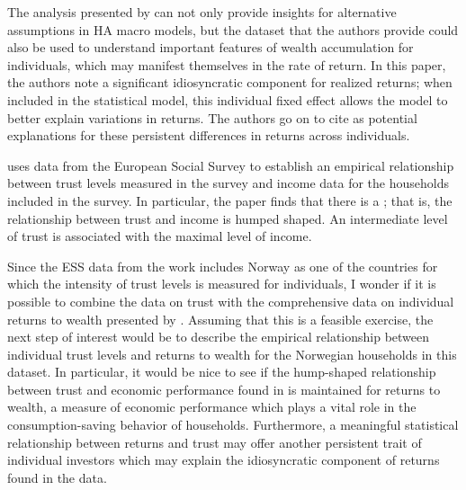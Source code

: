 \documentclass{scrartcl}
\begin{document}
The analysis presented by \cite{aflgdmlp20} can not only provide insights for alternative assumptions in HA macro models, but the dataset that the authors provide could also be used to understand important features of wealth accumulation for individuals, which may manifest themselves in the rate of return. In this paper, the authors note a significant idiosyncratic component for realized returns; when included in the statistical model, this individual fixed effect allows the model to better explain variations in returns. The authors go on to cite  as potential explanations for these persistent differences in returns across individuals.

\cite{jbpglg2016} uses data from the European Social Survey to establish an empirical relationship between trust levels measured in the survey and income data for the households included in the survey. In particular, the paper finds that there is a ; that is, the relationship between trust and income is humped shaped. An intermediate level of trust is associated with the maximal level of income. 

Since the ESS data from the \cite{jbpglg2016} work includes Norway as one of the countries for which the intensity of trust levels is measured for individuals, I wonder if it is possible to combine the data on trust with the comprehensive data on individual returns to wealth presented by \cite{aflgdmlp20}. Assuming that this is a feasible exercise, the next step of interest would be to describe the empirical relationship between individual trust levels and returns to wealth for the Norwegian households in this dataset. In particular, it would be nice to see if the hump-shaped relationship between trust and economic performance found in \cite{jbpglg2016} is maintained for returns to wealth, a measure of economic performance which plays a vital role in the consumption-saving behavior of households. Furthermore, a meaningful statistical relationship between returns and trust may offer another persistent trait of individual investors which may explain the idiosyncratic component of returns found in the data. 
\end{document}
